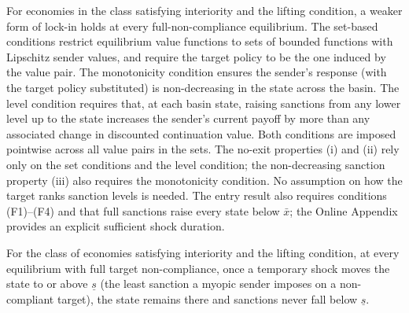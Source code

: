 For economies in the class satisfying interiority and the lifting
condition, a weaker form of lock-in holds at every full-non-compliance equilibrium. The
set-based conditions restrict equilibrium value functions to sets of bounded functions
with Lipschitz sender values, and require the target policy to be the one induced by
the value pair. The monotonicity condition ensures the sender's response (with the
target policy substituted) is non-decreasing in the state across the basin. The level
condition requires that, at each basin state, raising sanctions from any lower level up
to the state increases the sender's current payoff by more than any associated change in discounted continuation value. Both conditions are imposed pointwise across all
value pairs in the sets. The no-exit properties (i) and (ii) rely only on the set
conditions and the level condition; the non-decreasing sanction property (iii)
also requires the monotonicity condition. No assumption on how the target ranks
sanction levels is needed. The entry result also requires conditions \textup{(F1)--(F4)}
and that full sanctions raise every state below $\bar x$; the Online Appendix provides
an explicit sufficient shock duration.

For the class of economies satisfying interiority and the lifting condition, at every
equilibrium with full target non-compliance, once a temporary shock moves the state to
or above $\underline s$ (the least sanction a myopic sender imposes on a non-compliant target), the state remains there and
sanctions never fall below $\underline s$.

